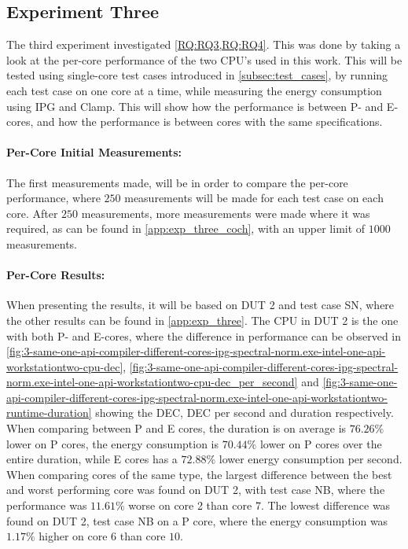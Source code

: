 \subsection{Experiment Three}\label{subsec:exp_three}

The third experiment investigated \cref{RQ:RQ3,RQ:RQ4}. This was done by taking a look at the per-core performance of the two CPU's used in this work. This will be tested using single-core test cases introduced in \cref{subsec:test_cases}, by running each test case on one core at a time, while measuring the energy consumption using IPG and Clamp. This will show how the performance is between P- and E-cores, and how the performance is between cores with the same specifications.

\paragraph{Per-Core Initial Measurements:} The first measurements made, will be in order to compare the per-core performance, where $250$ measurements will be made for each test case on each core. After $250$ measurements, more measurements were made where it was required, as can be found in \cref{app:exp_three_coch}, with an upper limit of $1000$ measurements.

\paragraph{Per-Core Results:} When presenting the results, it will be based on DUT 2 and test case SN, where the other results can be found in \cref{app:exp_three}. The CPU in DUT 2 is the one with both P- and E-cores, where the difference in performance can be observed in \cref{fig:3-same-one-api-compiler-different-cores-ipg-spectral-norm.exe-intel-one-api-workstationtwo-cpu-dec}, \cref{fig:3-same-one-api-compiler-different-cores-ipg-spectral-norm.exe-intel-one-api-workstationtwo-cpu-dec_per_second} and \cref{fig:3-same-one-api-compiler-different-cores-ipg-spectral-norm.exe-intel-one-api-workstationtwo-runtime-duration} showing the DEC, DEC per second and duration respectively. When comparing between P and E cores, the duration is on average is $76.26\%$ lower on P cores, the energy consumption is $70.44\%$ lower on P cores over the entire duration, while E cores has a $72.88\%$ lower energy consumption per second. When comparing cores of the same type, the largest difference between the best and worst performing core was found on DUT 2, with test case NB, where the performance was $11.61\%$ worse on core 2 than core 7. The lowest difference  was found on DUT 2, test case NB on a P core, where the energy consumption was $1.17\%$ higher on core $6$ than core $10$.






